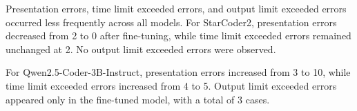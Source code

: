 Presentation errors, time limit exceeded errors, and output limit exceeded
errors occurred less frequently across all models. For StarCoder2, presentation
errors decreased from 2 to 0 after fine-tuning, while time limit exceeded errors
remained unchanged at 2. No output limit exceeded errors were observed.

For Qwen2.5-Coder-3B-Instruct, presentation errors increased from 3 to 10, while
time limit exceeded errors increased from 4 to 5. Output limit exceeded errors
appeared only in the fine-tuned model, with a total of 3 cases.


\begin{table}[h]
\centering
\caption{Additional execution error types}
\label{tab:error_types}
\end{table}


